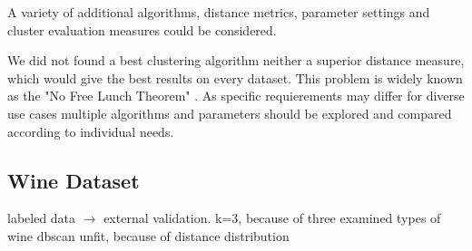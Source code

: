 A variety of additional algorithms, distance metrics, parameter settings and cluster evaluation measures could be considered.

We did not found a best clustering algorithm neither a superior distance measure, which would give the best results on every dataset. This problem is widely known as the "No Free Lunch Theorem" \cite{nofreelunch}. As specific requierements may differ for diverse use cases multiple algorithms and parameters should be explored and compared according to individual needs. 

\subsection{Wine Dataset}
labeled data $\rightarrow$ external validation.
k=3, because of three examined types of wine
dbscan unfit, because of distance distribution